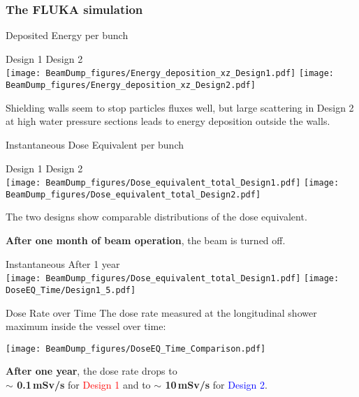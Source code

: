 \documentclass[xcolor={dvipsnames}]{beamer}
\begin{document}
\subsubsection{The FLUKA simulation}
\begin{frame}{Deposited Energy per bunch}
\begin{center}
\hspace*{1.6cm} Design 1 \hfill Design 2 \hspace*{1.8cm} \\
  \texttt{[image: BeamDump\_figures/Energy\_deposition\_xz\_Design1.pdf]}
    \texttt{[image: BeamDump\_figures/Energy\_deposition\_xz\_Design2.pdf]}
\end{center}
 Shielding walls seem to stop particles fluxes well, but large scattering in Design 2 at high water pressure sections leads to energy deposition outside the walls.
\end{frame}

\begin{frame}{Instantaneous Dose Equivalent per bunch}
\begin{center}
\hspace*{1.8cm} Design 1 \hfill Design 2 \hspace*{1.8cm} \\
  \texttt{[image: BeamDump\_figures/Dose\_equivalent\_total\_Design1.pdf]}
    \texttt{[image: BeamDump\_figures/Dose\_equivalent\_total\_Design2.pdf]}
\end{center}
The two designs show comparable distributions of the dose equivalent.
\end{frame}
\begin{frame}
\textbf{After one month of beam operation}, the beam is turned off.\\
  \begin{center}
    \hspace*{1.4cm} Instantaneous \hfill After 1 year\hspace*{2cm} \\
  \texttt{[image: BeamDump\_figures/Dose\_equivalent\_total\_Design1.pdf]}
  \texttt{[image: DoseEQ\_Time/Design1\_5.pdf]}
 \end{center}
\end{frame}
\begin{frame}{Dose Rate over Time}
The dose rate measured at the longitudinal shower maximum inside the vessel over time:
\begin{center}
  \texttt{[image: BeamDump\_figures/DoseEQ\_Time\_Comparison.pdf]}
\end{center}
\textbf{After one year}, the dose rate drops to \\\textbf{$\sim$ 0.1\,mSv/s} for \textcolor{Red}{Design 1} and to \textbf{$\sim$ 10\,mSv/s} for \textcolor{Blue}{Design 2}.
\end{frame}
\end{document}
